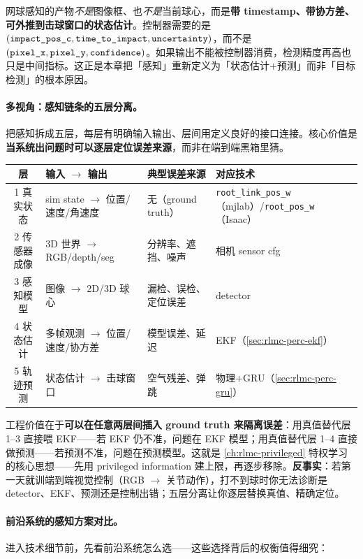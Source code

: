 \begin{insight}\label{ins:rlmc-perc-essence}
网球感知的产物\emph{不是}图像框、也\emph{不是}当前球心，而是\textbf{带 timestamp、带协方差、可外推到击球窗口的状态估计}。控制器需要的是 $(\verb|impact_pos_c|,\verb|time_to_impact|,\verb|uncertainty|)$，而不是 $(\verb|pixel_x|,\verb|pixel_y|,\verb|confidence|)$。如果输出不能被控制器消费，检测精度再高也只是中间指标。这正是本章把「感知」重新定义为「状态估计$+$预测」而非「目标检测」的根本原因。
\end{insight}

\paragraph{多视角：感知链条的五层分离。}把感知拆成五层，每层有明确输入输出、层间用定义良好的接口连接。核心价值是\textbf{当系统出问题时可以逐层定位误差来源}，而非在端到端黑箱里猜。

\begin{center}
\small
\begin{tabular}{@{}clll@{}}
\toprule
层 & 输入 $\to$ 输出 & 典型误差来源 & 对应技术 \\
\midrule
1 真实状态 & sim state $\to$ 位置/速度/角速度 & 无（ground truth） & \verb|root_link_pos_w|（mjlab）/\verb|root_pos_w|（Isaac） \\
2 传感器成像 & 3D 世界 $\to$ RGB/depth/seg & 分辨率、遮挡、噪声 & 相机 sensor cfg \\
3 感知模型 & 图像 $\to$ 2D/3D 球心 & 漏检、误检、定位误差 & detector \\
4 状态估计 & 多帧观测 $\to$ 位置/速度/协方差 & 模型误差、延迟 & EKF（\cref{sec:rlmc-perc-ekf}） \\
5 轨迹预测 & 状态估计 $\to$ 击球窗口 & 空气残差、弹跳 & 物理$+$GRU（\cref{sec:rlmc-perc-gru}） \\
\bottomrule
\end{tabular}
\end{center}

工程价值在于\textbf{可以在任意两层间插入 ground truth 来隔离误差}：用真值替代层 1--3 直接喂 EKF——若 EKF 仍不准，问题在 EKF 模型；用真值替代层 1--4 直接做预测——若预测不准，问题在预测模型。这就是 \cref{ch:rlmc-privileged} 特权学习的核心思想——先用 privileged information 建上限，再逐步移除。\textbf{反事实}：若第一天就训端到端视觉控制（RGB $\to$ 关节动作），打不到球时你无法诊断是 detector、EKF、预测还是控制出错；五层分离让你逐层替换真值、精确定位。

\paragraph{前沿系统的感知方案对比。}进入技术细节前，先看前沿系统怎么选——这些选择背后的权衡值得细究：


